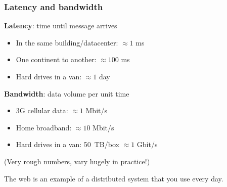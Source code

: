 \begin{frame}
    \label{s:latency-bandwidth}
    \frametitle{Latency and bandwidth}
    \textbf{Latency}: time until message arrives
    \begin{itemize}
        \item In the same building/datacenter: $\approx 1$ ms
        \item One continent to another: $\approx 100$ ms
        \item Hard drives in a van: $\approx 1$ day\\[2em]
    \end{itemize}\pause
    \textbf{Bandwidth}: data volume per unit time
    \begin{itemize}
        \item 3G cellular data: $\approx 1$ Mbit/s
        \item Home broadband: $\approx 10$ Mbit/s
        \item Hard drives in a van: 50~TB/box $\approx 1$ Gbit/s\\[1em]
    \end{itemize}
    (Very rough numbers, vary hugely in practice!)
\end{frame}

The web is an example of a distributed system that you use every day.

\begin{frame}[plain]
    \label{s:website}
\end{frame}

